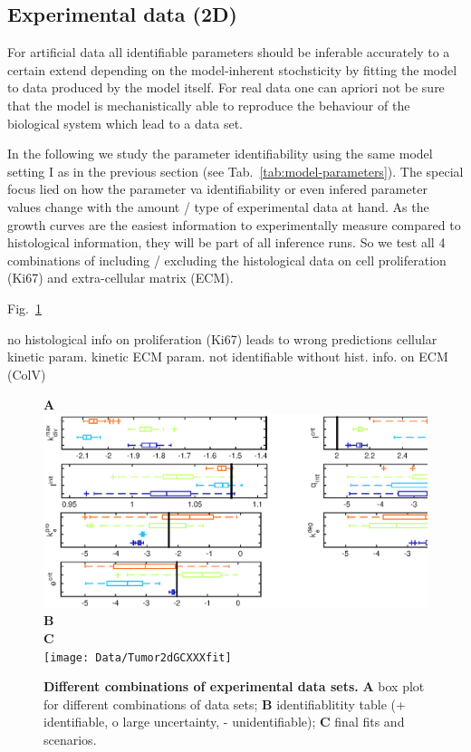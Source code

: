 \documentclass[10pt,letterpaper]{article}
\begin{document}
\subsection*{Experimental data (2D)} For artificial data all identifiable parameters should be inferable accurately to a certain extend depending on the model-inherent stochsticity by fitting the model to data produced by the model itself. For real data one can apriori not be sure that the model is mechanistically able to reproduce the behaviour of the biological system which lead to a data set. 

In the following we study the parameter identifiability using the same model setting I as in the previous section (see Tab.~\ref{tab:model-parameters}). The special focus lied on how the parameter va identifiability or even infered parameter values change with the amount / type of experimental data at hand. As the growth curves are the easiest information to experimentally measure compared to histological information, they will be part of all inference runs. So we test all 4 combinations of including / excluding the histological data on cell proliferation (Ki67) and extra-cellular matrix (ECM).

Fig.~\ref{fig:exp2d} 

no histological info on proliferation (Ki67) leads to wrong predictions cellular kinetic param.
kinetic ECM param. not identifiable without hist. info. on ECM (ColV)


\begin{figure}[htbp]
\textbf{A}\\
\includegraphics[width=\textwidth]{Data/Tumor2dGCXXXindependentBoxplots}\\
\textbf{B}\\


\textbf{C}\\
\texttt{[image: Data/Tumor2dGCXXXfit]}
\caption{{\bf Different combinations of experimental data sets.}
\textbf{A} box plot for different combinations of data sets; \textbf{B} identifiablitity table (+ identifiable, o large uncertainty, - unidentifiable); \textbf{C} final fits and scenarios.}
\label{fig:exp2d}
\end{figure}
\end{document}
